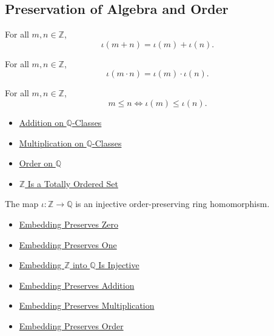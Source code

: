 \subsection*{Preservation of Algebra and Order}

\begin{theorem}
\label{thm:embedding-z-into-q-preserves-addition}
For all $m,n\in\mathbb{Z}$,
\[
\iota(m+n)=\iota(m)+\iota(n).
\]
\end{theorem}

\begin{theorem}
\label{thm:embedding-z-into-q-preserves-multiplication}
For all $m,n\in\mathbb{Z}$,
\[
\iota(m\cdot n)=\iota(m)\cdot\iota(n).
\]
\end{theorem}

\begin{theorem}
\label{thm:embedding-z-into-q-preserves-order}
For all $m,n\in\mathbb{Z}$,
\[
m\le n
\Longleftrightarrow
\iota(m)\le\iota(n).
\]
\end{theorem}

\begin{dependencies}
\begin{itemize}
  \item \hyperref[def:addition-on-q-classes]{Addition on $\mathbb{Q}$-Classes}
  \item \hyperref[def:multiplication-on-q-classes]{Multiplication on $\mathbb{Q}$-Classes}
  \item \hyperref[def:order-on-q]{Order on $\mathbb{Q}$}
  \item \hyperref[thm:z-totally-ordered-set]{$\mathbb{Z}$ Is a Totally Ordered Set}
\end{itemize}
\end{dependencies}

\begin{theorem}
\label{thm:z-embeds-into-q}
The map $\iota:\mathbb{Z}\to\mathbb{Q}$ is an injective order-preserving ring
homomorphism.
\end{theorem}

\begin{dependencies}
\begin{itemize}
  \item \hyperref[thm:embedding-z-into-q-preserves-zero]{Embedding Preserves Zero}
  \item \hyperref[thm:embedding-z-into-q-preserves-one]{Embedding Preserves One}
  \item \hyperref[thm:embedding-z-into-q-injective]{Embedding $\mathbb{Z}$ into $\mathbb{Q}$ Is Injective}
  \item \hyperref[thm:embedding-z-into-q-preserves-addition]{Embedding Preserves Addition}
  \item \hyperref[thm:embedding-z-into-q-preserves-multiplication]{Embedding Preserves Multiplication}
  \item \hyperref[thm:embedding-z-into-q-preserves-order]{Embedding Preserves Order}
\end{itemize}
\end{dependencies}

